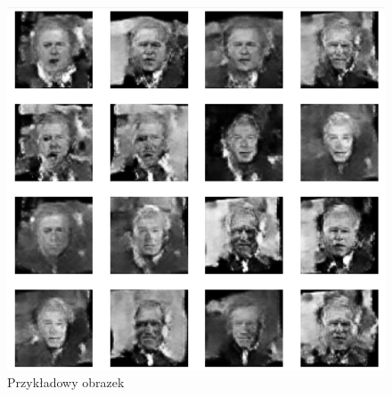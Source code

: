 \documentclass[wi]{zut}
\begin{document}
\begin{figure}[H]
    \centering
    \includegraphics[width=0.7\linewidth]{images/sample.png}
    \caption{Przykładowy obrazek}
    \label{fig:pdgd}
\end{figure}
\end{document}
